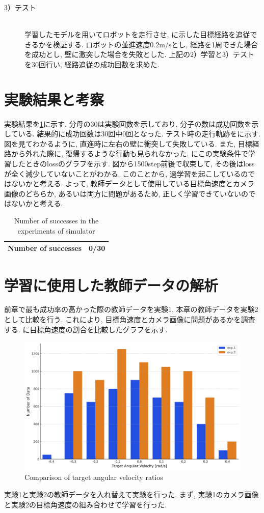 \begin{description}
  \item[3）テスト]\mbox{}\\ \hspace*{3mm}学習したモデルを用いてロボットを走行させ, に示した目標経路を追従できるかを検証する. ロボットの並進速度0.2m/sとし, 経路を1周できた場合を成功とし, 壁に激突した場合を失敗とした. 上記の2）学習と3）テストを30回行い, 経路追従の成功回数を求めた. 
\end{description}

\section{実験結果と考察}
実験結果を\ref{tb:exp2}に示す. 分母の30は実験回数を示しており, 分子の数は成功回数を示している. 結果的に成功回数は30回中0回となった. テスト時の走行軌跡をに示す. 図を見てわかるように, 直進時に左右の壁に衝突して失敗している. また, 目標経路から外れた際に, 復帰するような行動も見られなかった. にこの実験条件で学習したときのlossのグラフを示す. 図から1500step前後で収束して, その後はlossが全く減少していないことがわかる. このことから, 過学習を起こしているのではないかと考える. よって, 教師データとして使用している目標角速度とカメラ画像のどちらか, あるいは両方に問題があるため, 正しく学習できていないのではないかと考える. 

\begin{table}[h]
  \centering
  \caption{Number of successes in the experiments of simulator}
  \begin{tabular}{|c|c|} \hline
      Number of successes & 0/30 \\ \hline
    \end{tabular}
  \label{tb:exp2}
\end{table}

\section{学習に使用した教師データの解析}
前章で最も成功率の高かった際の教師データを実験1, 本章の教師データを実験2として比較を行う. これにより, 目標角速度とカメラ画像に問題があるかを調査する. に目標角速度の割合を比較したグラフを示す. 

\begin{figure}[h]
  \centering
  \includegraphics[keepaspectratio, scale=0.5]{images/output.png}
  \caption{Comparison of target angular velocity ratios}
  \label{Fig:ratio}
\end{figure}

実験1と実験2の教師データを入れ替えて実験を行った. まず, 実験1のカメラ画像と実験2の目標角速度の組み合わせで学習を行った.